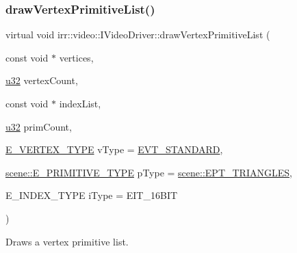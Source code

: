 \subsubsection{\texorpdfstring{draw\+Vertex\+Primitive\+List()}{drawVertexPrimitiveList()}\hspace{0.1cm}{\footnotesize\ttfamily [1/2]}}
{\footnotesize\ttfamily virtual void irr\+::video\+::\+I\+Video\+Driver\+::draw\+Vertex\+Primitive\+List (\begin{DoxyParamCaption}\item[{const void $\ast$}]{vertices,  }\item[{\hyperlink{namespaceirr_a0416a53257075833e7002efd0a18e804}{u32}}]{vertex\+Count,  }\item[{const void $\ast$}]{index\+List,  }\item[{\hyperlink{namespaceirr_a0416a53257075833e7002efd0a18e804}{u32}}]{prim\+Count,  }\item[{\hyperlink{namespaceirr_1_1video_a0e3b59e025e0d0db0ed2ee0ce904deac}{E\+\_\+\+V\+E\+R\+T\+E\+X\+\_\+\+T\+Y\+PE}}]{v\+Type = {\ttfamily \hyperlink{namespaceirr_1_1video_a0e3b59e025e0d0db0ed2ee0ce904deaca921f287a4f48d612a5be2d89453ca262}{E\+V\+T\+\_\+\+S\+T\+A\+N\+D\+A\+RD}},  }\item[{\hyperlink{namespaceirr_1_1scene_a5d7de82f2169761194b2f44d95cdc1dc}{scene\+::\+E\+\_\+\+P\+R\+I\+M\+I\+T\+I\+V\+E\+\_\+\+T\+Y\+PE}}]{p\+Type = {\ttfamily \hyperlink{namespaceirr_1_1scene_a5d7de82f2169761194b2f44d95cdc1dca6c884c4de3210b3ed36c99fb828ce376}{scene\+::\+E\+P\+T\+\_\+\+T\+R\+I\+A\+N\+G\+L\+ES}},  }\item[{E\+\_\+\+I\+N\+D\+E\+X\+\_\+\+T\+Y\+PE}]{i\+Type = {\ttfamily EIT\+\_\+16BIT} }\end{DoxyParamCaption})\hspace{0.3cm}{\ttfamily [pure virtual]}}



Draws a vertex primitive list. 

